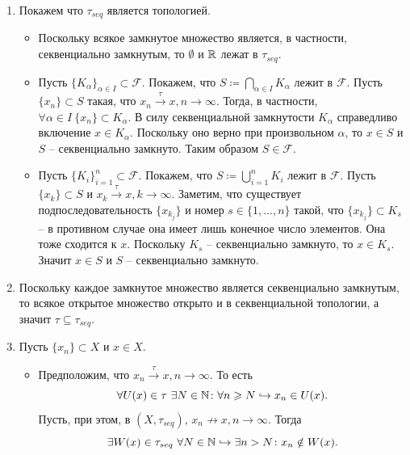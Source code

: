 \begin{solve}
    \begin{enumerate}
        \item Покажем что $\tau_{seq}$ является топологией.
        \begin{itemize}
            \item Поскольку всякое замкнутое множество является, в частности, секвенциально замкнутым, то $\emptyset$ и $\mathbb{R}$ лежат в $\tau_{seq}$.
            \item Пусть $\{K_\alpha\}_{\alpha \in I} \subset \mathcal{F}$. Покажем, что $S \coloneq \bigcap_{\alpha \in I} K_\alpha$ лежит в $\mathcal{F}$. Пусть $\{x_n\} \subset S$ такая, что $x_n \xrightarrow{\tau} x, n \rightarrow \infty$. Тогда, в частности, $\forall \alpha \in I \ \{x_n\} \subset K_\alpha$. В силу секвенциальной замкнутости $K_\alpha$ справедливо включение $x \in K_\alpha$. Поскольку оно верно при произвольном $\alpha$, то $x \in S$ и $S$ -- секвенциально замкнуто. Таким образом $S \in \mathcal{F}$.
            \item Пусть $\{K_i\}_{i = 1}^n \subset \mathcal{F}$. Покажем, что $S \coloneq \bigcup_{i = 1}^n K_i$ лежит в $\mathcal{F}$. Пусть $\{x_k\} \subset S$ и $x_k \xrightarrow{\tau} x, k \rightarrow \infty$. Заметим, что существует подпоследовательность $\{x_{k_j}\}$ и номер $s \in \{1, \ldots, n\}$ такой, что $\{x_{k_j}\} \subset K_s$ -- в противном случае она имеет лишь конечное число элементов. Она тоже сходится к $x$. Поскольку $K_s$ -- секвенциально замкнуто, то $x \in K_s$. Значит $x \in S$ и $S$ -- секвенциально замкнуто.
        \end{itemize}
        \item Поскольку каждое замкнутое множество является секвенциально замкнутым, то всякое открытое множество открыто и в секвенциальной топологии, а значит $\tau \subseteq \tau_{seq}$.
        \item Пусть $\{x_n\} \subset X$ и $x \in X$.
        \begin{itemize}
            \item Предположим, что $x_n \xrightarrow{\tau} x, n \rightarrow \infty$.
            То есть
            \[
                \forall U(x) \in \tau \ \exists N \in \mathbb{N} \colon \forall n \geqslant N \hookrightarrow x_n \in U(x).
            \]
            Пусть, при этом, в $(X, \tau_{seq})$, $x_n  \not\rightarrow x, n \rightarrow \infty$.
            Тогда
            \[
                \exists W(x) \in \tau_{seq} \ \forall N \in \mathbb{N}\hookrightarrow \exists n > N\colon x_n \notin W(x).
            \]

\end{itemize}
\end{enumerate}
\end{solve}
